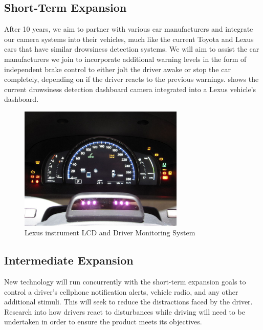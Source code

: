 \subsection{Short-Term Expansion}
After 10 years, we aim to partner with various car manufacturers and integrate our camera systems into their vehicles, much like the current Toyota \cite{toyota} and Lexus \cite{lexus} cars that have similar drowsiness detection systems. We will aim to assist the car manufacturers we join to incorporate additional warning levels in the form of independent brake control to either jolt the driver awake or stop the car completely, depending on if the driver reacts to the previous warnings.  shows the current drowsiness detection dashboard camera integrated into a Lexus vehicle's dashboard.

\begin{figure}[H]
\centering
\includegraphics[width=0.7\textwidth]{images/lexus_monitoring}
\vskip10pt
\caption[Lexus Dashboard]{Lexus instrument LCD and Driver Monitoring System \cite{lexusdash}}
\label{fig:lexusdash}
\end{figure}

\subsection{Intermediate Expansion}
New technology will run concurrently with the short-term expansion goals to control a driver's cellphone notification alerts, vehicle radio, and any other additional stimuli. This will seek to reduce the distractions faced by the driver. Research into how drivers react to disturbances while driving will need to be undertaken in order to ensure the product meets its objectives.


